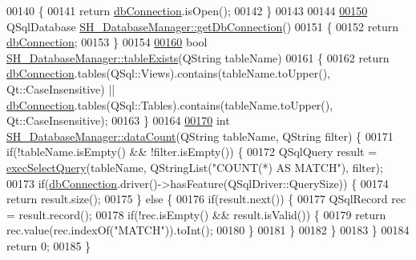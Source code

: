 \begin{DoxyCode}
00140 \{
00141     \textcolor{keywordflow}{return} \hyperlink{classSH__DatabaseManager_a9291f61c3abbba2c4f1567b1d8325f0e}{dbConnection}.isOpen();
00142 \}
00143 
00144 
\hypertarget{SH__DatabaseManager_8cpp_source_l00150}{}\hyperlink{classSH__DatabaseManager_adf7c1e261fd3feed3dea6614d8a80d5f}{00150} QSqlDatabase \hyperlink{classSH__DatabaseManager_adf7c1e261fd3feed3dea6614d8a80d5f}{SH\_DatabaseManager::getDbConnection}()
00151 \{
00152     \textcolor{keywordflow}{return} \hyperlink{classSH__DatabaseManager_a9291f61c3abbba2c4f1567b1d8325f0e}{dbConnection};
00153 \}
00154 
\hypertarget{SH__DatabaseManager_8cpp_source_l00160}{}\hyperlink{classSH__DatabaseManager_af83a53b26cee86b3194cac14928115ed}{00160} \textcolor{keywordtype}{bool} \hyperlink{classSH__DatabaseManager_af83a53b26cee86b3194cac14928115ed}{SH\_DatabaseManager::tableExists}(QString tableName)
00161 \{
00162     \textcolor{keywordflow}{return} \hyperlink{classSH__DatabaseManager_a9291f61c3abbba2c4f1567b1d8325f0e}{dbConnection}.tables(QSql::Views).contains(tableName.toUpper(), Qt::CaseInsensitive) 
      || \hyperlink{classSH__DatabaseManager_a9291f61c3abbba2c4f1567b1d8325f0e}{dbConnection}.tables(QSql::Tables).contains(tableName.toUpper(), Qt::CaseInsensitive);
00163 \}
00164 
\hypertarget{SH__DatabaseManager_8cpp_source_l00170}{}\hyperlink{classSH__DatabaseManager_ad3e372d89b60b43e3f3bae649be6d7fb}{00170} \textcolor{keywordtype}{int} \hyperlink{classSH__DatabaseManager_ad3e372d89b60b43e3f3bae649be6d7fb}{SH\_DatabaseManager::dataCount}(QString tableName, QString filter) \{
00171     \textcolor{keywordflow}{if}(!tableName.isEmpty() && !filter.isEmpty()) \{
00172         QSqlQuery result = \hyperlink{classSH__DatabaseManager_ab8f9850cb68444ab9a4e613b36a3b044}{execSelectQuery}(tableName, QStringList(\textcolor{stringliteral}{"COUNT(*) AS MATCH"}), 
      filter);
00173         \textcolor{keywordflow}{if}(\hyperlink{classSH__DatabaseManager_a9291f61c3abbba2c4f1567b1d8325f0e}{dbConnection}.driver()->hasFeature(QSqlDriver::QuerySize)) \{
00174             \textcolor{keywordflow}{return} result.size();
00175         \} \textcolor{keywordflow}{else} \{
00176             \textcolor{keywordflow}{if}(result.next()) \{
00177                 QSqlRecord rec = result.record();
00178                 \textcolor{keywordflow}{if}(!rec.isEmpty()  && result.isValid()) \{
00179                     \textcolor{keywordflow}{return} rec.value(rec.indexOf(\textcolor{stringliteral}{"MATCH"})).toInt();
00180                 \}
00181             \}
00182         \}
00183     \}
00184     \textcolor{keywordflow}{return} 0;
00185 \}

\end{DoxyCode}
